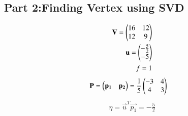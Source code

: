 \documentclass[journal,12pt,twocolumn]{IEEEtran}
\begin{document}
\subsection{Part 2:Finding Vertex using SVD}
\begin{align}
\mathbf{V} = \begin{pmatrix}16&12\\12&9\end{pmatrix}\label{eq V}\\ 
\mathbf{u} = \begin{pmatrix}-\frac{5}{2}\\-5\end{pmatrix}\label{eq U} \\ 
f = 1 \label{eq f}
\end{align}
\begin{align}
\mathbf{P}&=\begin{pmatrix}\mathbf{p_1}&\mathbf{p_2}\end{pmatrix}=\frac{1}{5}\begin{pmatrix}-3&4\\ 4 &3\end{pmatrix}\label{eq P}    
\end{align}
\begin{align}
\eta=\vec{u}^T\vec{p_1}=-\frac{5}{2}
\end{align}
\end{document}
